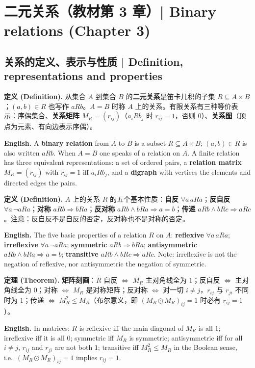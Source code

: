 \documentclass[UTF8,11pt,a4paper]{ctexart}
\newcommand{\EN}[1]{\par\noindent \textbf{English.} #1\par}
\newcommand{\DEF}[2]{\par\noindent\textbf{定义 (Definition).} #1\par\EN{#2}}
\newcommand{\THM}[2]{\par\noindent\textbf{定理 (Theorem).} #1\par\EN{#2}}
\begin{document}
\section[二元关系（第 3 章）]{二元关系（教材第 3 章）| Binary relations (Chapter 3)}
\subsection{关系的定义、表示与性质 | Definition, representations and properties}
\DEF{从集合 $A$ 到集合 $B$ 的\textbf{二元关系}是笛卡儿积的子集 $R\subseteq A\times B$；$(a,b)\in R$ 也写作 $aRb$。$A=B$ 时称 $A$ 上的关系。有限关系有三种等价表示：序偶集合、\textbf{关系矩阵} $M_R=(r_{ij})$（$a_iRb_j$ 时 $r_{ij}=1$，否则 $0$）、\textbf{关系图}（顶点为元素、有向边表示序偶）。}{A \textbf{binary relation} from $A$ to $B$ is a subset $R\subseteq A\times B$; $(a,b)\in R$ is also written $aRb$. When $A=B$ one speaks of a relation on $A$. A finite relation has three equivalent representations: a set of ordered pairs, a \textbf{relation matrix} $M_R=(r_{ij})$ with $r_{ij}=1$ iff $a_iRb_j$, and a \textbf{digraph} with vertices the elements and directed edges the pairs.}
\DEF{$A$ 上的关系 $R$ 的五个基本性质：\textbf{自反} $\forall a\,aRa$；\textbf{反自反} $\forall a\,\neg aRa$；\textbf{对称} $aRb\Rightarrow bRa$；\textbf{反对称} $aRb\wedge bRa\Rightarrow a=b$；\textbf{传递} $aRb\wedge bRc\Rightarrow aRc$。注意：反自反不是自反的否定，反对称也不是对称的否定。}{The five basic properties of a relation $R$ on $A$: \textbf{reflexive} $\forall a\,aRa$; \textbf{irreflexive} $\forall a\,\neg aRa$; \textbf{symmetric} $aRb\Rightarrow bRa$; \textbf{antisymmetric} $aRb\wedge bRa\Rightarrow a=b$; \textbf{transitive} $aRb\wedge bRc\Rightarrow aRc$. Note: irreflexive is not the negation of reflexive, nor antisymmetric the negation of symmetric.}
\THM{\textbf{矩阵刻画}：$R$ 自反 $\Leftrightarrow$ $M_R$ 主对角线全为 $1$；反自反 $\Leftrightarrow$ 主对角线全为 $0$；对称 $\Leftrightarrow$ $M_R$ 是对称矩阵；反对称 $\Leftrightarrow$ 对一切 $i\ne j$，$r_{ij}$ 与 $r_{ji}$ 不同时为 $1$；传递 $\Leftrightarrow$ $M_R^2\le M_R$（布尔意义，即 $(M_R\odot M_R)_{ij}=1$ 时必有 $r_{ij}=1$）。}{In matrices: $R$ is reflexive iff the main diagonal of $M_R$ is all $1$; irreflexive iff it is all $0$; symmetric iff $M_R$ is symmetric; antisymmetric iff for all $i\ne j$, $r_{ij}$ and $r_{ji}$ are not both $1$; transitive iff $M_R^2\le M_R$ in the Boolean sense, i.e.\ $(M_R\odot M_R)_{ij}=1$ implies $r_{ij}=1$.}
\end{document}
